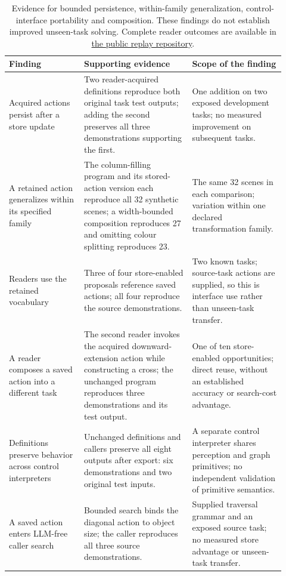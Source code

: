 \documentclass[11pt]{article}
\begin{document}
\begin{table}[htbp]
\centering\small
\begin{tabular}{p{0.25\linewidth}p{0.36\linewidth}p{0.31\linewidth}}
\hline
Finding & Supporting evidence & Scope of the finding \\
\hline
Acquired actions persist after a store update & Two reader-acquired definitions reproduce both original task test outputs; adding the second preserves all three demonstrations supporting the first. & One addition on two exposed development tasks; no measured improvement on subsequent tasks. \\
A retained action generalizes within its specified family & The column-filling program and its stored-action version each reproduce all 32 synthetic scenes; a width-bounded composition reproduces 27 and omitting colour splitting reproduces 23. & The same 32 scenes in each comparison; variation within one declared transformation family. \\
Readers use the retained vocabulary & Three of four store-enabled proposals reference saved actions; all four reproduce the source demonstrations. & Two known tasks; source-task actions are supplied, so this is interface use rather than unseen-task transfer. \\
A reader composes a saved action into a different task & The second reader invokes the acquired downward-extension action while constructing a cross; the unchanged program reproduces three demonstrations and its test output. & One of ten store-enabled opportunities; direct reuse, without an established accuracy or search-cost advantage. \\
Definitions preserve behavior across control interpreters & Unchanged definitions and callers preserve all eight outputs after export: six demonstrations and two original test inputs. & A separate control interpreter shares perception and graph primitives; no independent validation of primitive semantics. \\
A saved action enters LLM-free caller search & Bounded search binds the diagonal action to object size; the caller reproduces all three source demonstrations. & Supplied traversal grammar and an exposed source task; no measured store advantage or unseen-task transfer. \\
\hline
\end{tabular}
\caption{Evidence for bounded persistence, within-family generalization, control-interface portability and composition. These findings do not establish improved unseen-task solving. Complete reader outcomes are available in \href{https://github.com/lenyabloko/arc-gol-paper-replay/tree/ddcdac9ab3f164c65f3f5ba626b2b9cf84d8f244}{the public replay repository}.}
\label{tab:execution-results}
\end{table}
\end{document}
